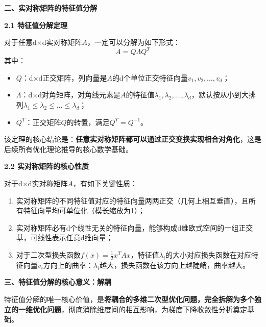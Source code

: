 \documentclass[10pt]{article}
\numberwithin{equation}{section}
\theoremstyle{plain}
\theoremstyle{definition}
\theoremstyle{remark}
\begin{document}
{\par\vspace{1ex}\noindent\large\bfseries\color{brandD} 二、实对称矩阵的特征值分解\par}
{\par\vspace{0.8ex}\noindent\normalsize\bfseries\color{accentD} 2.1 特征值分解定理\par}
\begin{RemarkBox}[定理1（实对称矩阵的特征值分解）]
对于任意d$\times$d实对称矩阵$A$，一定可以分解为如下形式：
\[ A = Q \Lambda Q^T \]
其中：
\begin{itemize}[leftmargin=*,nosep]
    \item $Q$：d$\times$d正交矩阵，列向量是$A$的d个单位正交特征向量$v_1,v_2,\dots,v_d$；
    \item $\Lambda$：d$\times$d对角矩阵，对角线元素是$A$的特征值$\lambda_1,\lambda_2,\dots,\lambda_d$，默认按从小到大排列$\lambda_1 \le \lambda_2 \le \dots \le \lambda_d$；
    \item $Q^T$：正交矩阵$Q$的转置，满足$Q^T=Q^{-1}$。
\end{itemize}
\end{RemarkBox}
该定理的核心结论是：\textbf{任意实对称矩阵都可以通过正交变换实现相合对角化}，这是后续所有优化理论推导的核心数学基础。

{\par\vspace{0.8ex}\noindent\normalsize\bfseries\color{accentD} 2.2 实对称矩阵的核心性质\par}
\begin{RemarkBox}[命题1（实对称矩阵的核心性质）]
对于d$\times$d实对称矩阵$A$，有如下关键性质：
\begin{enumerate}[label=\arabic*., leftmargin=*]
    \item 实对称矩阵的不同特征值对应的特征向量两两正交（几何上相互垂直），且所有特征向量均可单位化（模长缩放为1）；
    \item 实对称矩阵必有d个线性无关的特征向量，能够构成d维欧式空间的一组正交基，可线性表示任意d维向量；
    \item 对于二次型损失函数$f(x)=\frac{1}{2}x^T A x$，特征值$\lambda_i$的大小对应损失函数在对应特征向量$v_i$方向上的曲率：$\lambda_i$越大，损失函数在该方向上越陡峭，曲率越大。
\end{enumerate}
\end{RemarkBox}

{\par\vspace{1ex}\noindent\large\bfseries\color{brandD} 三、特征值分解的核心意义：解耦\par}\par\vspace{0.5ex}
特征值分解的唯一核心价值，是\textbf{将耦合的多维二次型优化问题，完全拆解为多个独立的一维优化问题}，彻底消除维度间的相互影响，为梯度下降收敛性分析奠定基础。
\end{document}

